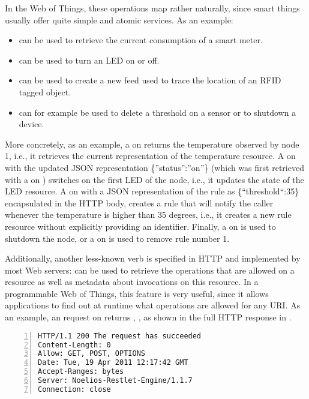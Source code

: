 In the Web of Things, these operations map rather naturally, since smart things usually offer quite simple and atomic services. As an example:
\begin{itemize}
 \item {} can be used to retrieve the current consumption of a smart meter.
 \item {} can be used to turn an LED on or off.
 \item {} can be used to create a new feed used to trace the location of an RFID tagged object.
 \item {} can for example be used to delete a threshold on a sensor or to shutdown a device.
\end{itemize}

More concretely, as an example, a  on
returns the temperature observed by node 1, i.e., it retrieves the current representation of the temperature resource. A  on
with the updated JSON representation \{''status'':''on''\} (which was first retrieved with a  on ) switches on the first LED of the node, i.e., it updates the state of the LED resource. A  on
with a JSON representation of the rule as \{``threshold``:35\} encapsulated in the HTTP body, creates a rule that will notify the caller whenever the temperature is higher than 35 degrees, i.e., it creates a new rule resource without explicitly providing an identifier. Finally, a  on
 is used to shutdown the node, or a  on 
 is used to remove rule number 1.

Additionally, another less-known verb is specified in HTTP and implemented by most Web servers:  can be used to retrieve the operations that are allowed on a resource as well as metadata about invocations on this resource. In a programmable Web of Things, this feature is very useful, since it allows applications to find out at runtime what operations are allowed for any URI. As an example, an  request on 
returns , ,  as shown in the full HTTP response in .

\begin{lstlisting}[caption=HTTP response of an \code{OPTIONS} request on a resource. It informs the client about the operations (\code{GET} and \code{POST}) available for the resource., label=lst:HTTPOptions, breaklines, numbers=left, numberstyle=\tiny, language={}, xleftmargin=0.8cm, basicstyle=\small\ttfamily, backgroundcolor=\color{gray}, captionpos=b]
HTTP/1.1 200 The request has succeeded
Content-Length: 0
Allow: GET, POST, OPTIONS
Date: Tue, 19 Apr 2011 12:17:42 GMT
Accept-Ranges: bytes
Server: Noelios-Restlet-Engine/1.1.7
Connection: close
\end{lstlisting}

